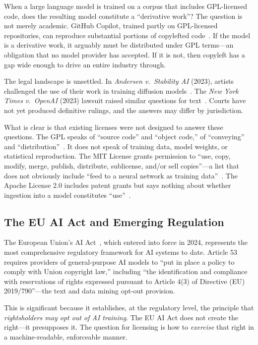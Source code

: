 \documentclass[11pt,twocolumn]{article}
\begin{document}
When a large language model is trained on a corpus that includes
GPL-licensed code, does the resulting model constitute a ``derivative
work''? The question is not merely academic. GitHub Copilot, trained
partly on GPL-licensed repositories, can reproduce substantial portions
of copylefted code~\cite{copilot2022controversy}. If the model is a
derivative work, it arguably must be distributed under GPL terms---an
obligation that no model provider has accepted. If it is not, then
copyleft has a gap wide enough to drive an entire industry through.

The legal landscape is unsettled. In \emph{Andersen v.\ Stability AI}
(2023), artists challenged the use of their work in training diffusion
models~\cite{andersen2023}. The \emph{New York Times v.\ OpenAI} (2023)
lawsuit raised similar questions for text~\cite{nyt2023openai}. Courts
have not yet produced definitive rulings, and the answers may differ by
jurisdiction.

What is clear is that existing licenses were not designed to answer these
questions. The GPL speaks of ``source code'' and ``object code,'' of
``conveying'' and ``distribution''~\cite{gplv3}. It does not speak of
training data, model weights, or statistical reproduction. The MIT
License grants permission to ``use, copy, modify, merge, publish,
distribute, sublicense, and/or sell copies''---a list that does not
obviously include ``feed to a neural network as training
data''~\cite{mit-license}. The Apache License 2.0 includes patent
grants but says nothing about whether ingestion into a model constitutes
``use''~\cite{apache2}.

\subsection{The EU AI Act and Emerging Regulation}

The European Union's AI Act~\cite{eu-ai-act-2024}, which entered into
force in 2024, represents the most comprehensive regulatory framework
for AI systems to date. Article 53 requires providers of general-purpose
AI models to ``put in place a policy to comply with Union copyright law,''
including ``the identification and compliance with reservations of rights
expressed pursuant to Article 4(3) of Directive (EU) 2019/790''---the
text and data mining opt-out provision.

This is significant because it establishes, at the regulatory level, the
principle that \emph{rightsholders may opt out of AI training}. The EU
AI Act does not create the right---it presupposes it. The question for
licensing is how to \emph{exercise} that right in a machine-readable,
enforceable manner.
\end{document}
